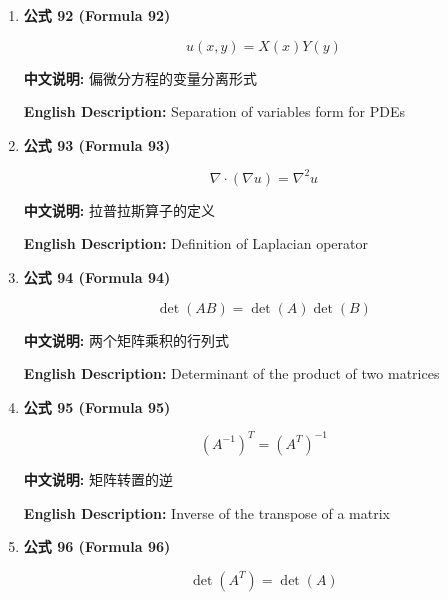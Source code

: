 \documentclass[12pt,a4paper]{article}
\begin{document}
\begin{enumerate}[leftmargin=*]
\vspace{0.5cm}

\item \textbf{公式 92 (Formula 92)}

\begin{equation}
u(x, y) = X(x)Y(y)
\end{equation}

\textbf{中文说明:} 偏微分方程的变量分离形式

\textbf{English Description:} Separation of variables form for PDEs

\vspace{0.5cm}

\item \textbf{公式 93 (Formula 93)}

\begin{equation}
\nabla \cdot (\nabla u) = \nabla^2 u
\end{equation}

\textbf{中文说明:} 拉普拉斯算子的定义

\textbf{English Description:} Definition of Laplacian operator

\vspace{0.5cm}

\item \textbf{公式 94 (Formula 94)}

\begin{equation}
\det(AB) = \det(A)\det(B)
\end{equation}

\textbf{中文说明:} 两个矩阵乘积的行列式

\textbf{English Description:} Determinant of the product of two matrices

\vspace{0.5cm}

\item \textbf{公式 95 (Formula 95)}

\begin{equation}
(A^{-1})^T = (A^T)^{-1}
\end{equation}

\textbf{中文说明:} 矩阵转置的逆

\textbf{English Description:} Inverse of the transpose of a matrix

\vspace{0.5cm}

\item \textbf{公式 96 (Formula 96)}

\begin{equation}
\det(A^T) = \det(A)
\end{equation}


\end{enumerate}
\end{document}

